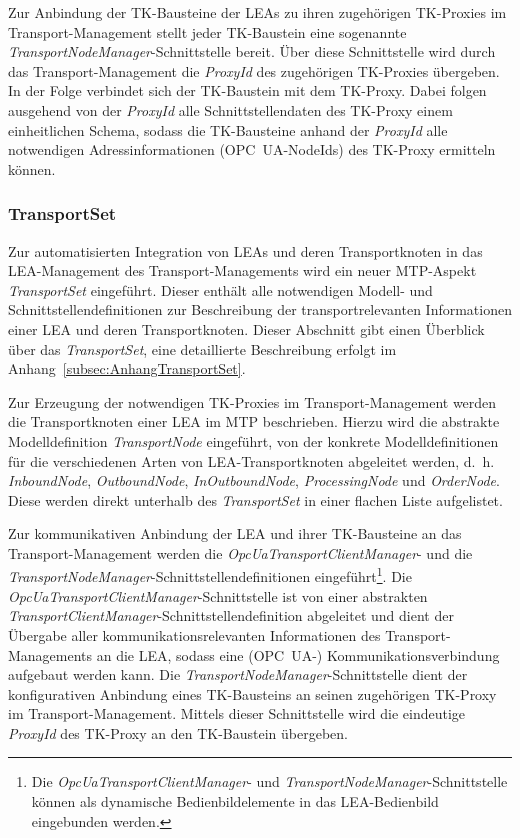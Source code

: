 Zur Anbindung der TK-Bausteine der LEAs zu ihren zugehörigen TK-Proxies im Transport-Management stellt jeder TK-Baustein eine sogenannte \emph{Transport\-Node\-Manager}-Schnittstelle bereit. Über diese Schnittstelle wird durch das Transport-Management die \emph{ProxyId} des zugehörigen TK-Proxies übergeben. In der Folge verbindet sich der TK-Baustein mit dem TK-Proxy. Dabei folgen ausgehend von der \emph{ProxyId} alle Schnittstellendaten des TK-Proxy einem einheitlichen Schema, sodass die TK-Bausteine anhand der \emph{ProxyId} alle notwendigen Adressinformationen (OPC~UA-NodeIds) des TK-Proxy ermitteln können. 

\subsubsection{TransportSet}
\label{subsubsec:TransportSet}

Zur automatisierten Integration von LEAs und deren Transportknoten in das LEA-Management des Transport-Managements wird ein neuer MTP-Aspekt \emph{TransportSet} eingeführt. Dieser enthält alle notwendigen Modell- und Schnittstellendefinitionen zur Beschreibung der transportrelevanten Informationen einer LEA und deren Transportknoten. Dieser Abschnitt gibt einen Überblick über das \emph{TransportSet}, eine detaillierte Beschreibung erfolgt im Anhang~\ref{subsec:AnhangTransportSet}. 

Zur Erzeugung der notwendigen TK-Proxies im Transport-Management werden die Transportknoten einer LEA im MTP beschrieben. Hierzu wird die abstrakte Modelldefinition \emph{TransportNode} eingeführt, von der konkrete Modelldefinitionen für die verschiedenen Arten von LEA-Transportknoten abgeleitet werden, d.~h. \emph{InboundNode}, \emph{OutboundNode}, \emph{InOutboundNode}, \emph{ProcessingNode} und \emph{OrderNode}. Diese werden direkt unterhalb des \emph{TransportSet} in einer flachen Liste aufgelistet.

Zur kommunikativen Anbindung der LEA und ihrer TK-Bausteine an das Transport-Management werden die \emph{OpcUaTransportClientManager}- und die \emph{TransportNodeManager}-Schnitt\-stel\-len\-de\-fi\-ni\-tio\-nen eingeführt\footnote{Die \emph{OpcUaTransportClientManager}- und \emph{TransportNodeManager}-Schnittstelle können als dynamische Bedienbildelemente in das LEA-Bedienbild eingebunden werden.}. Die \emph{OpcUaTransportClientManager}-Schnittstelle ist von einer abstrakten \emph{TransportClientManager}-Schnitt\-stel\-len\-de\-fi\-ni\-ti\-on abgeleitet und dient der Übergabe aller kommunikationsrelevanten Informationen des Transport-Managements an die LEA, sodass eine (OPC~UA-) Kommunikationsverbindung aufgebaut werden kann. Die \emph{TransportNodeManager}-Schnittstelle dient der konfigurativen Anbindung eines TK-Bausteins an seinen zugehörigen TK-Proxy im Transport-Management. Mittels dieser Schnittstelle wird die eindeutige \emph{ProxyId} des TK-Proxy an den TK-Baustein übergeben.

